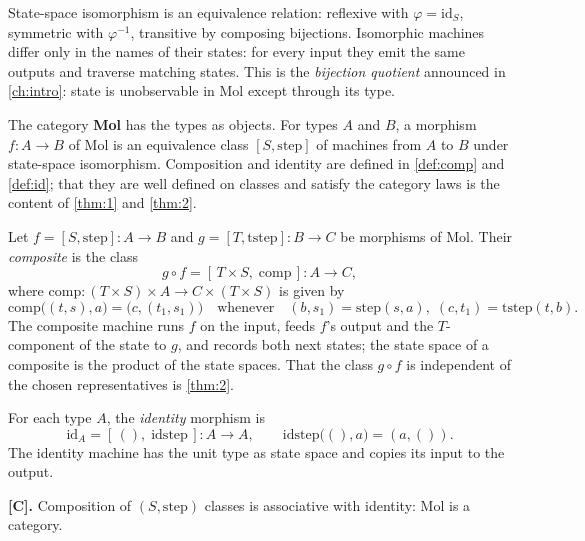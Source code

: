 \begin{remark}
State-space isomorphism is an equivalence relation: reflexive with
$\varphi = \mathrm{id}_S$, symmetric with $\varphi^{-1}$, transitive by
composing bijections. Isomorphic machines differ only in the names of their
states: for every input they emit the same outputs and traverse matching
states. This is the \emph{bijection quotient} announced in
\autoref{ch:intro}: state is unobservable in Mol except through its type.
\end{remark}

\begin{definition}\label{def:mol}
The category \textbf{Mol} has the types as objects. For types $A$ and $B$, a
morphism $f : A \to B$ of Mol is an equivalence class $[S, \mathrm{step}]$ of
machines from $A$ to $B$ under state-space isomorphism. Composition and
identity are defined in \autoref{def:comp} and \autoref{def:id}; that they
are well defined on classes and satisfy the category laws is the content of
\autoref{thm:1} and \autoref{thm:2}.
\end{definition}

\begin{definition}[Composition]\label{def:comp}
Let $f = [S, \mathrm{step}] : A \to B$ and $g = [T, \mathrm{tstep}] : B \to C$
be morphisms of Mol. Their \emph{composite} is the class
\[ g \circ f = [\, T \times S,\; \mathrm{comp} \,] : A \to C , \]
where $\mathrm{comp} : (T \times S) \times A \to C \times (T \times S)$ is given
by
\[ \mathrm{comp}\bigl ((t, s), a\bigr) = \bigl (c, (t_1, s_1)\bigr)
   \quad\text{whenever}\quad (b, s_1) = \mathrm{step} (s, a),\; (c, t_1)
   = \mathrm{tstep} (t, b) . \]
The composite machine runs $f$ on the input, feeds $f$'s output and the
$T$-component of the state to $g$, and records both next states; the state
space of a composite is the product of the state spaces. That the class
$g \circ f$ is independent of the chosen representatives is \autoref{thm:2}.
\end{definition}

\begin{definition}[Identity]\label{def:id}
For each type $A$, the \emph{identity} morphism is
\[ \mathrm{id}_A = [\, (),\; \mathrm{idstep} \,] : A \to A ,
   \qquad \mathrm{idstep}\bigl ((), a\bigr) = (a, ()) . \]
The identity machine has the unit type as state space and copies its input to
the output.
\end{definition}

\begin{theorem}\label{thm:1}
\textbf{[C].} Composition of $(S, \mathrm{step})$ classes is associative with
identity: Mol is a category.
\end{theorem}

